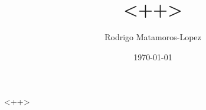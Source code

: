 \documentclass[11pt]{article}
\title{<++>}
\author{Rodrigo Matamoros-Lopez}
\date{\today}
\begin{document}
\maketitle

<++>
\end{document}
